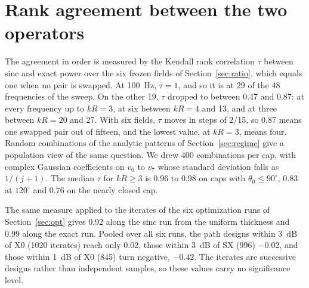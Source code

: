 \documentclass[preprint,12pt]{elsarticle}
\begin{document}
\section{Rank agreement between the two operators}
\label{app:ranking}
The agreement in order is measured by the Kendall rank correlation $\tau$ between sinc and exact power over the six frozen fields of Section~\ref{sec:ratio}, which equals one when no pair is swapped. At 100~Hz, $\tau=1$, and so it is at 29 of the 48 frequencies of the sweep. %
On the other 19, $\tau$ dropped to between 0.47 and 0.87: at every frequency up to $kR=3$, at six between $kR=4$ and 13, and at three between $kR=20$ and 27. %
With six fields, $\tau$ moves in steps of 2/15, so 0.87 means one swapped pair out of fifteen, and the lowest value, at $kR=3$, means four. %
Random combinations of the analytic patterns of Section~\ref{sec:regime} give a population view of the same question. We drew 400 combinations per cap, with complex Gaussian coefficients on $v_0$ to $v_7$ whose standard deviation falls as $1/(j+1)$. The median $\tau$ for $kR\ge3$ is 0.96 to 0.98 on caps with $\theta_0\le90^\circ$, 0.83 at $120^\circ$ and 0.76 on the nearly closed cap. %

The same measure applied to the iterates of the six optimization runs of Section~\ref{sec:opt} gives 0.92 along the sinc run from the uniform thickness and 0.99 along the exact run. Pooled over all six runs, the path designs within 3~dB of X0 (1020 iterates) reach only 0.02, those within 3~dB of SX (996) $-0.02$, and those within 1~dB of X0 (845) turn negative, $-0.42$. The iterates are successive designs rather than independent samples, so these values carry no significance level. %
\end{document}
